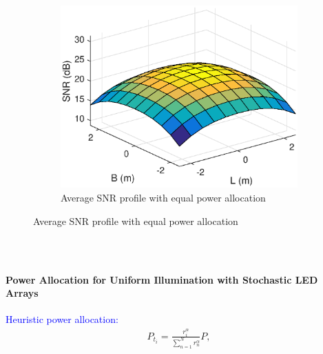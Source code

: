 \documentclass[slidestop,usepdftitle=false]{gvvslides}
\providecommand{\sbrak}[1]{\ensuremath{{}\left[#1\right]}}
\begin{document}
\begin{frame}
\begin{figure}[t!]
\begin{subfigure}[t]{0.5\columnwidth}
        \includegraphics[width=\columnwidth]{randomNoPowerDist_new}
        \caption{Average SNR profile with equal power allocation}
\label{fig3:subfig2}
    \end{subfigure}
  \end{figure}
\end{frame}


\begin{frame}
\frametitle{\,}
\framesubtitle{Power Allocation for Uniform Illumination with
Stochastic LED Arrays}
\begin{list}{}{}
\item \textcolor{blue}{Heuristic power allocation:}
\begin{align}
\label{power_alloc}
P_{t_i}=\frac{r_i^{\alpha}}{\sum_{n=1}^Nr_n^{\alpha}}P,\nonumber
\end{align}
\end{list}
 \end{frame}
\end{document}
